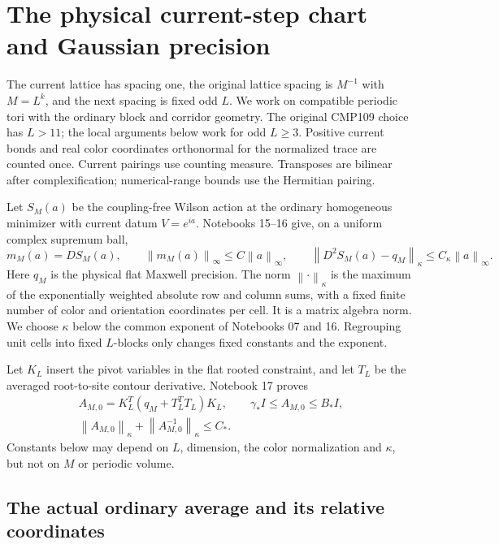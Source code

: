 \documentclass[11pt]{article}
\theoremstyle{remark}
\newcommand{\norm}[1]{\left\|#1\right\|}
\begin{document}
\section{The physical current-step chart and Gaussian precision}
\label{pc-section}

The current lattice has spacing one, the original lattice spacing
is $M^{-1}$ with $M=L^k$, and the next spacing is fixed odd $L$.
We work on compatible periodic tori with the ordinary block and
corridor geometry. The original CMP109 choice has $L>11$; the
local arguments below work for odd $L\ge3$. Positive current bonds
and real color coordinates orthonormal for the normalized trace
are counted once. Current pairings use counting measure.
Transposes are bilinear after complexification; numerical-range
bounds use the Hermitian pairing.

Let $S_M(a)$ be the coupling-free Wilson action at the ordinary
homogeneous minimizer with current datum $V=e^{ia}$. Notebooks
15--16 give, on a uniform complex supremum ball,
\begin{equation}\label{pc-classical-input}
 m_M(a)=DS_M(a),\qquad
 \norm{m_M(a)}_\infty\le C\norm a_\infty,\qquad
 \norm{D^2S_M(a)-q_M}_\kappa\le C_\kappa\norm a_\infty.
\end{equation}
Here $q_M$ is the physical flat Maxwell precision. The norm
$\norm{\cdot}_\kappa$ is the maximum of the exponentially weighted
absolute row and column sums, with a fixed finite number of
color and orientation coordinates per cell. It is a matrix
algebra norm. We choose $\kappa$ below the common exponent of
Notebooks 07 and 16. Regrouping unit cells into fixed $L$-blocks
only changes fixed constants and the exponent.

Let $K_L$ insert the pivot variables in the flat rooted constraint,
and let $T_L$ be the averaged root-to-site contour derivative.
Notebook 17 proves
\begin{equation}\label{pc-flat-input}
 \begin{gathered}
 A_{M,0}=K_L^T(q_M+T_L^TT_L)K_L,\qquad
 \gamma_*I\le A_{M,0}\le B_*I,\\
 \norm{A_{M,0}}_\kappa+\norm{A_{M,0}^{-1}}_\kappa\le C_*.
 \end{gathered}
\end{equation}
Constants below may depend on $L$, dimension, the color
normalization and $\kappa$, but not on $M$ or periodic volume.

\subsection{The actual ordinary average and its relative coordinates}
\label{pc-source-maps}
\end{document}
